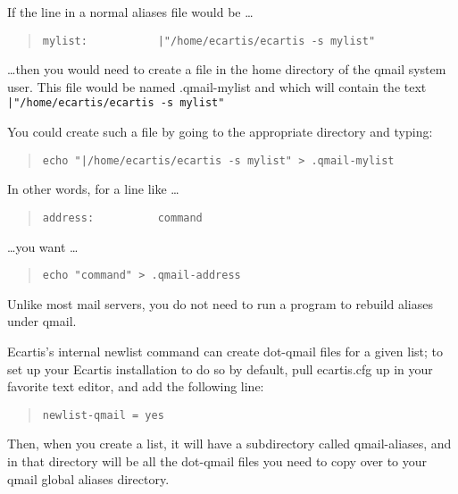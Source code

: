 \documentclass{book}
\begin{document}
If the line in a normal aliases file would be \ldots

\begin{quote}
\footnotesize
\begin{verbatim}
mylist:           |"/home/ecartis/ecartis -s mylist"
\end{verbatim}
\end{quote}
   
\ldots then you would need to create a file in the home directory of the qmail
system user.  This file would be named .qmail-mylist and which will contain
the text \verb+|"/home/ecartis/ecartis -s mylist"+
   
You could create such a file by going to the appropriate directory and typing:
   
\begin{quote}
\footnotesize
\begin{verbatim} 
echo "|/home/ecartis/ecartis -s mylist" > .qmail-mylist
\end{verbatim}
\end{quote}

In other words, for a line like \ldots

\begin{quote}   
\footnotesize
\begin{verbatim}
address:          command
\end{verbatim}
\end{quote}   
   
\ldots you want \ldots
   
\begin{quote}
\footnotesize
\begin{verbatim}
echo "command" > .qmail-address
\end{verbatim}
\end{quote}   
   
Unlike most mail servers, you do not need to run a program to rebuild aliases
under qmail.
   
Ecartis's internal newlist command can create dot-qmail files for a given
list; to set up your Ecartis installation to do so by default, pull
ecartis.cfg up in your favorite text editor, and add the following line:

\begin{quote}
\footnotesize
\begin{verbatim}
newlist-qmail = yes
\end{verbatim}
\end{quote}
   
Then, when you create a list, it will have a subdirectory called
qmail-aliases, and in that directory will be all the dot-qmail files you need
to copy over to your qmail global aliases directory.
   
\end{document}
